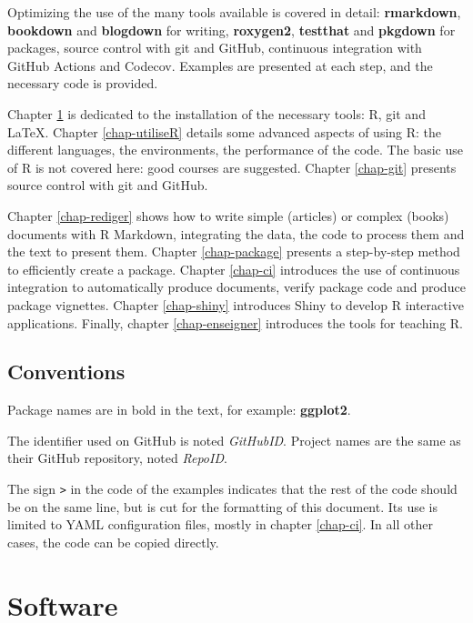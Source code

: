 \documentclass[
  12pt,
  american,
  a4paper,
  extrafontsizes,onecolumn,openright
  ]{memoir}
\newlength{\rf}
\begin{document}
Optimizing the use of the many tools available is covered in detail: \textbf{rmarkdown}, \textbf{bookdown} and \textbf{blogdown} for writing, \textbf{roxygen2}, \textbf{testthat} and \textbf{pkgdown} for packages, source control with git and GitHub, continuous integration with GitHub Actions and Codecov.
Examples are presented at each step, and the necessary code is provided.

Chapter \ref{chap-logiciels} is dedicated to the installation of the necessary tools: R, git and LaTeX.
Chapter \ref{chap-utiliseR} details some advanced aspects of using R: the different languages, the environments, the performance of the code.
The basic use of R is not covered here: good courses are suggested.
Chapter \ref{chap-git} presents source control with git and GitHub.

Chapter \ref{chap-rediger} shows how to write simple (articles) or complex (books) documents with R Markdown, integrating the data, the code to process them and the text to present them.
Chapter \ref{chap-package} presents a step-by-step method to efficiently create a package.
Chapter \ref{chap-ci} introduces the use of continuous integration to automatically produce documents, verify package code and produce package vignettes.
Chapter \ref{chap-shiny} introduces Shiny to develop R interactive applications.
Finally, chapter \ref{chap-enseigner} introduces the tools for teaching R.

\hypertarget{conventions}{%
\section*{Conventions}\label{conventions}}

Package names are in bold in the text, for example: \textbf{ggplot2}.

The identifier used on GitHub is noted \emph{GitHubID}.
Project names are the same as their GitHub repository, noted \emph{RepoID}.

The sign \texttt{\textbar{}\textgreater{}} in the code of the examples indicates that the rest of the code should be on the same line, but is cut for the formatting of this document.
Its use is limited to YAML configuration files, mostly in chapter \ref{chap-ci}.
In all other cases, the code can be copied directly.

\mainmatter

\hypertarget{chap-logiciels}{%
\chapter{Software}\label{chap-logiciels}}
\end{document}
